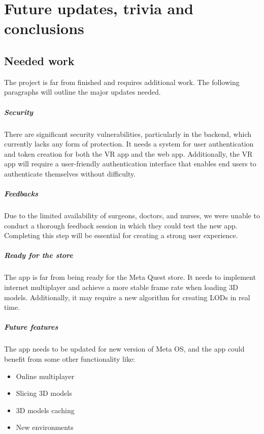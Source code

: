 
\chapter{Future updates, trivia and conclusions}
\label{chp:conclusions}

\section{Needed work}
\noindent
The project is far from finished and requires additional work. The following paragraphs will outline the major updates needed.

\paragraph{Security}
There are significant security vulnerabilities, particularly in the backend, which currently lacks any form of protection. It needs a system for user authentication and token creation for both the \ac{VR} app and the web app.
Additionally, the \ac{VR} app will require a user-friendly authentication interface that enables end users to authenticate themselves without difficulty.

\paragraph{Feedbacks}
Due to the limited availability of surgeons, doctors, and nurses, we were unable to conduct a thorough feedback session in which they could test the new app. Completing this step will be essential for creating a strong user experience.

\paragraph{Ready for the store}
The app is far from being ready for the Meta Quest store. It needs to implement internet multiplayer and achieve a more stable frame rate when loading 3D models.
Additionally, it may require a new algorithm for creating \ac{LOD}s in real time.

\paragraph{Future features}
The app needs to be updated for new version of Meta OS, and the app could benefit from some other functionality like:

\begin{itemize}
  \item Online multiplayer
  \item	Slicing 3D models
  \item	3D models caching 
  \item	New environments
\end{itemize}

